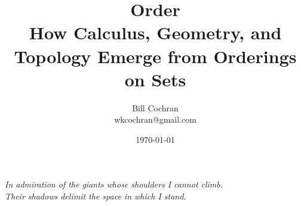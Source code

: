 \documentclass[12pt,oneside]{book}
\begin{document}
\title{Order\\
\large How Calculus, Geometry, and Topology Emerge from Orderings on Sets}

\author{Bill Cochran\\wkcochran@gmail.com}
\date{\today}

\maketitle

\begin{center}
\vspace*{2em}
\textit{In admiration of the giants whose shoulders I cannot climb. \\
Their shadows delimit the space in which I stand.}
\vspace*{6em}
\end{center}

\newpage
\frontmatter
\onehalfspacing


\tableofcontents


\mainmatter











\cleardoublepage

\backmatter

\nocite{davey2002}


\end{document}
